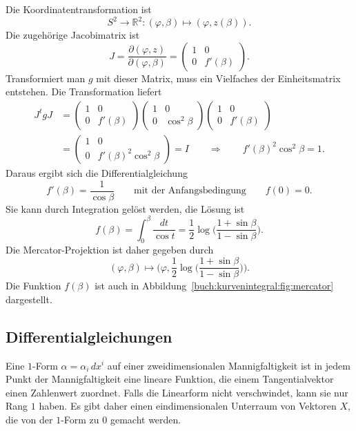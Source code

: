 Die Koordinatentransformation ist
\[
S^2\to\mathbb{R}^2
:
(\varphi,\beta) \mapsto (\varphi, z(\beta)).
\]
Die zugehörige Jacobimatrix ist
\[
J
=
\frac{\partial(\varphi,z)}{\partial(\varphi,\beta)}
=
\begin{pmatrix}
 1 & 0 \\
 0 & f'(\beta)
\end{pmatrix}.
\]
Transformiert man $g$ mit dieser Matrix, muss ein Vielfaches der
Einheitsmatrix entstehen.
Die Transformation liefert
\begin{align*}
J^tgJ
&=
\begin{pmatrix}
 1 & 0 \\
 0 & f'(\beta)
\end{pmatrix}
\begin{pmatrix}
 1 & 0           \\
 0 & \cos^2\beta
\end{pmatrix}
\begin{pmatrix}
 1 & 0 \\
 0 & f'(\beta)
\end{pmatrix}
\\
&=
\begin{pmatrix}
1&0\\
0&f'(\beta)^2\cos^2\beta
\end{pmatrix}
=
I
\qquad\Rightarrow\qquad
f'(\beta)^2\cos^2\beta = 1.
\end{align*}
Daraus ergibt sich die Differentialgleichung
\[
f'(\beta)=\frac{1}{\cos \beta}
\qquad\text{mit der Anfangsbedingung}\qquad
f(0)=0.
\]
Sie kann durch Integration gelöst werden, die Lösung ist
\[
f(\beta)
=
\int_0^\beta \frac{dt}{\cos t}
=
\frac12 \log\biggl(
\frac{1+\sin\beta}{1-\sin\beta}
\biggr).
\]
Die Mercator-Projektion ist daher gegeben durch
\begin{equation}
(\varphi,\beta) \mapsto \biggl(
\varphi,\frac12\log\biggl(\frac{1+\sin\beta}{1-\sin\beta}\biggr)
\biggr).
\label{buch:kurvenintegral:differential:eqn:mercatorprojektion}
\end{equation}
%
Die Funktion $f(\beta)$ ist auch in
Abbildung~\ref{buch:kurvenintegral:fig:mercator} dargestellt.
 
%
%
\subsection{Differentialgleichungen}
Eine $1$-Form $\alpha = \alpha_i\,dx^i$ auf einer zweidimensionalen
Mannigfaltigkeit ist in jedem Punkt der Mannigfaltigkeit eine lineare
Funktion, die einem Tangentialvektor einen Zahlenwert zuordnet.
Falls die Linearform nicht verschwindet, kann sie nur Rang $1$
haben.
Es gibt daher einen eindimensionalen Unterraum von Vektoren $X$, die
von der $1$-Form zu $0$ gemacht werden.

